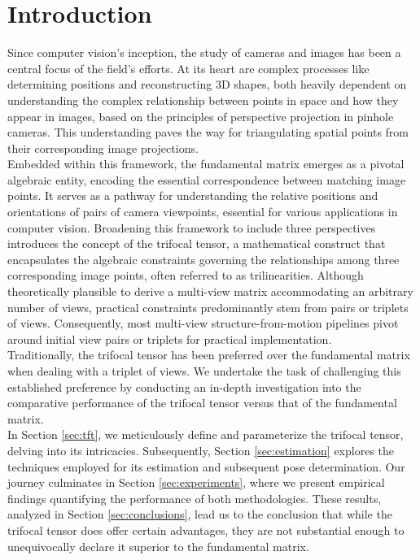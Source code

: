 \section{Introduction}\label{sec:intro}
Since computer vision's inception, the study of cameras and images has been a central focus of the field's efforts. At its heart are complex processes like determining positions and reconstructing 3D shapes, both heavily dependent on understanding the complex relationship between points in space and how they appear in images, based on the principles of perspective projection in pinhole cameras. This understanding paves the way for triangulating spatial points from their corresponding image projections.\\

Embedded within this framework, the fundamental matrix emerges as a pivotal algebraic entity, encoding the essential correspondence between matching image points. It serves as a pathway for understanding the relative positions and orientations of pairs of camera viewpoints, essential for various applications in computer vision. Broadening this framework to include three perspectives introduces the concept of the trifocal tensor, a mathematical construct that encapsulates the algebraic constraints governing the relationships among three corresponding image points, often referred to as trilinearities. Although theoretically plausible to derive a multi-view matrix accommodating an arbitrary number of views, practical constraints predominantly stem from pairs or triplets of views. Consequently, most multi-view structure-from-motion pipelines pivot around initial view pairs or triplets for practical implementation.\\

Traditionally, the trifocal tensor has been preferred over the fundamental matrix when dealing with a triplet of views. We undertake the task of challenging this established preference by conducting an in-depth investigation into the comparative performance of the trifocal tensor versus that of the fundamental matrix.\\

In Section \ref{sec:tft}, we meticulously define and parameterize the trifocal tensor, delving into its intricacies. Subsequently, Section \ref{sec:estimation} explores the techniques employed for its estimation and subsequent pose determination. Our journey culminates in Section \ref{sec:experiments}, where we present empirical findings quantifying the performance of both methodologies. These results, analyzed in Section \ref{sec:conclusions}, lead us to the conclusion that while the trifocal tensor does offer certain advantages, they are not substantial enough to unequivocally declare it superior to the fundamental matrix.

